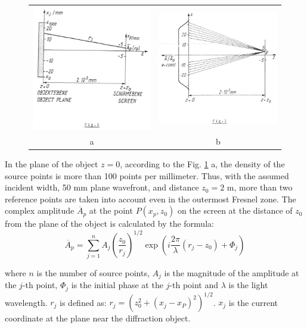 \documentclass[letterpaper,11pt,oneside,reqno]{amsart}
\numberwithin{equation}{section}
\theoremstyle{definition}
\theoremstyle{qqq}
\begin{document}
\begin{figure}
\begin{tabular}{cc}
    {\includegraphics[width=160pt]{fig1.png}}
    &{\includegraphics[width=160pt]{fig3.png}}\\ a&b
\end{tabular}
\label{Formulation}
\end{figure}

In the plane of the object $z=0$, according to the Fig. \ref{Formulation} a, the density of the source points is more than 100 points per millimeter. Thus, with the assumed incident width, 50 mm plane wavefront, and distance $z_0 = 2$ m, more than two reference points are taken into account even in the outermost Fresnel zone. The complex amplitude $\overline{A}_p$ at the point $P{(x_p, z_0)}$ on the screen at the distance of $z_0$ from the plane of the object is calculated by the formula:
\begin{equation}
\overline{A}_p = \sum_{j=1}^{n} A_j \left(\frac{z_0}{r_j} \right)^{1/2} \exp \left(i \frac{2\pi}{\lambda} \left(r_j - z_0\right) + \Phi_j\right)
\end{equation}

where $n$ is the number of source points, $A_j$ is the magnitude of the amplitude at the $j$-th point, $\Phi_j$ is the initial phase at the $j$-th point and $\lambda$ is the light wavelength. $r_j$ is  defined as: $r_j = \left(z_0^2 + \left(x_j - x_P\right)^2\right)^{1/2}$. $x_j$ is the current coordinate at the plane near the diffraction object.
\end{document}
